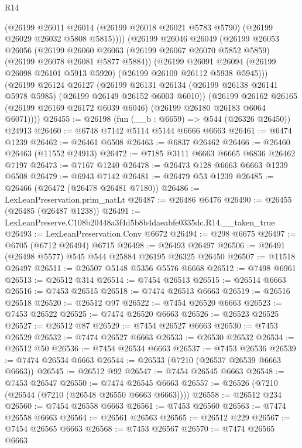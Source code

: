 \begin{lexlean}{R14}
\begin{coremodule}
        (@26199
          @26011
          @26014
          (@26199 @26018 @26021 @5783 @5790)
          (@26199 @26029 @26032 @5808 @5815))))
    (@26199
      @26046
      @26049
      (@26199
        @26053
        @26056
        (@26199 @26060 @26063 (@26199 @26067 @26070 @5852 @5859) (@26199 @26078 @26081 @5877 @5884))
        (@26199
          @26091
          @26094
          (@26199 @26098 @26101 @5913 @5920)
          (@26199 @26109 @26112 @5938 @5945)))
      (@26199
        @26124
        @26127
        (@26199 @26131 @26134 (@26199 @26138 @26141 @5978 @5985) (@26199 @26149 @26152 @6003 @6010))
        (@26199
          @26162
          @26165
          (@26199 @26169 @26172 @6039 @6046)
          (@26199 @26180 @26183 @6064 @6071))))
@26455 := @26198 (fun (__b : @6659) => @544 (@26326 @26450)) @24913
@26460 := @6748 @7142 @5114 @5144 @6666 @6663
@26461 := @6474 @1239
@26462 := @26461 @6508
@26463 := @6837 @26462
@26466 := @26460 @26463 (@11552 @24913)
@26472 := @7185 @3111 @6663 @6665 @6836 @26462 @7197
@26473 := @7167 @1240
@26478 := @26473 @128 @6663 @6663 @1239 @6508
@26479 := @6943 @7142
@26481 := @26479 @53 @1239
@26485 := @26466 (@26472 (@26478 @26481 @7180))
@26486 := LexLeanPreservation.prim_natLt
@26487 := @26486 @6476
@26490 := @26455 (@26485 (@26487 @1238))
@26491 := LexLeanPreserve.C108b20448a3f4d5b8b4daeabfe0335dc.R14.__taken_true
@26493 := LexLeanPreservation.Conv @6672
@26494 := @298 @6675
@26497 := @6705 (@6712 @26494) @6715
@26498 := @26493 @26497
@26506 := @26491 (@26498 @5577) @545 @544 @25884 @26195 @26325 @26450
@26507 := @11518 @26497
@26511 := @26507 @5148 @5356 @5576 @6668
@26512 := @7498 @6961
@26513 := @26512 @314
@26514 := @7454 @26513
@26515 := @26514 @6663
@26516 := @7453 @26515
@26518 := @7474 @26513 @6663
@26519 := @26516 @26518
@26520 := @26512 @97
@26522 := @7454 @26520 @6663
@26523 := @7453 @26522
@26525 := @7474 @26520 @6663
@26526 := @26523 @26525
@26527 := @26512 @87
@26529 := @7454 @26527 @6663
@26530 := @7453 @26529
@26532 := @7474 @26527 @6663
@26533 := @26530 @26532
@26534 := @26512 @50
@26536 := @7454 @26534 @6663
@26537 := @7453 @26536
@26539 := @7474 @26534 @6663
@26544 := @26533 (@7210 (@26537 @26539 @6663 @6663))
@26545 := @26512 @92
@26547 := @7454 @26545 @6663
@26548 := @7453 @26547
@26550 := @7474 @26545 @6663
@26557 := @26526 (@7210 (@26544 (@7210 (@26548 @26550 @6663 @6663))))
@26558 := @26512 @234
@26560 := @7454 @26558 @6663
@26561 := @7453 @26560
@26563 := @7474 @26558 @6663
@26564 := @26561 @26563
@26565 := @26512 @229
@26567 := @7454 @26565 @6663
@26568 := @7453 @26567
@26570 := @7474 @26565 @6663

\end{coremodule}
\end{lexlean}
